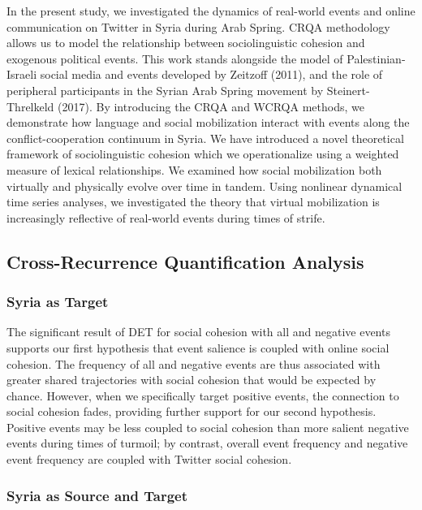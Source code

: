 \documentclass[
  english,
  man]{apa6}
\begin{document}
In the present study, we investigated the dynamics of real-world events and
online communication on Twitter in Syria during Arab Spring. CRQA methodology
allows us to model the relationship between sociolinguistic cohesion and
exogenous political events. This work stands alongside the model of
Palestinian-Israeli social media and events developed by Zeitzoff (2011), and
the role of peripheral participants in the Syrian Arab Spring movement by
Steinert-Threlkeld (2017). By introducing the CRQA and WCRQA methods, we
demonstrate how language and social mobilization interact with events along the
conflict-cooperation continuum in Syria. We have introduced a novel theoretical
framework of sociolinguistic cohesion which we operationalize using a weighted
measure of lexical relationships. We examined how social mobilization both
virtually and physically evolve over time in tandem. Using nonlinear dynamical
time series analyses, we investigated the theory that virtual mobilization is
increasingly reflective of real-world events during times of strife.

\hypertarget{cross-recurrence-quantification-analysis-2}{%
\subsection{Cross-Recurrence Quantification Analysis}\label{cross-recurrence-quantification-analysis-2}}

\hypertarget{syria-as-target-2}{%
\subsubsection{Syria as Target}\label{syria-as-target-2}}

The significant result of DET for social cohesion with all and negative events
supports our first hypothesis that event salience is coupled with online social
cohesion. The frequency of all and negative events are thus associated with
greater shared trajectories with social cohesion that would be expected by
chance. However, when we specifically target positive events, the connection to
social cohesion fades, providing further support for our second hypothesis.
Positive events may be less coupled to social cohesion than more salient
negative events during times of turmoil; by contrast, overall event frequency
and negative event frequency are coupled with Twitter social cohesion.

\hypertarget{syria-as-source-and-target-2}{%
\subsubsection{Syria as Source and Target}\label{syria-as-source-and-target-2}}
\end{document}

